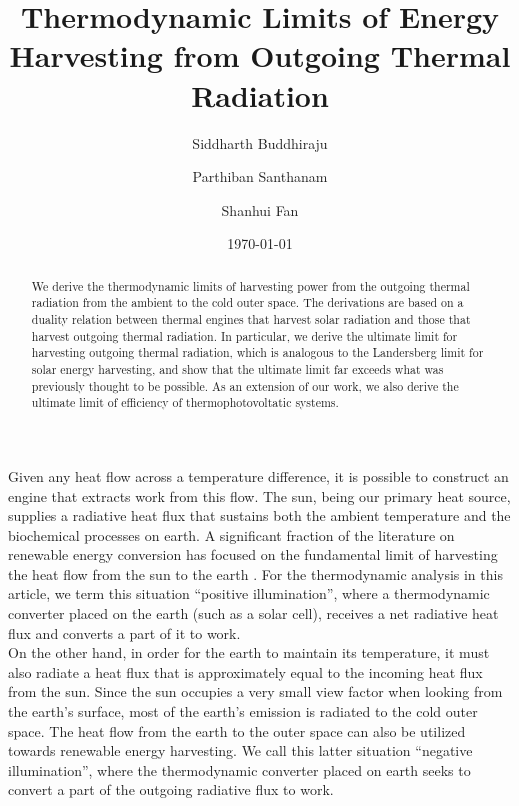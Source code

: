 \documentclass[notitlepage,onecolumn,aps,showpacs,preprintnumbers,amsmath,amssymb,superscriptaddress]{revtex4-1}
\begin{document}
\title{Thermodynamic Limits of Energy Harvesting from Outgoing Thermal Radiation}
\bigskip
\author{Siddharth Buddhiraju}
\author{Parthiban Santhanam}
\author{Shanhui Fan}
\date{\today}
\medskip
\widetext

\begin{abstract}
We derive the thermodynamic limits of harvesting power from the outgoing thermal radiation from the ambient to the cold outer space. The derivations are based on a duality relation between thermal engines that harvest solar radiation and those that harvest outgoing thermal radiation. In particular, we derive the ultimate limit for harvesting outgoing thermal radiation, which is analogous to the Landersberg limit for solar energy harvesting, and show that the ultimate limit far exceeds what was previously thought to be possible.  As an extension of our work, we also derive the ultimate limit of efficiency of thermophotovoltatic systems. 
\end{abstract}
\maketitle
Given any heat flow across a temperature difference, it is possible to construct an engine that extracts work from this flow. The sun, being our primary heat source, supplies a radiative heat flux that sustains both the ambient temperature and the biochemical processes on earth. A significant fraction of the literature on renewable energy conversion has focused on the fundamental limit of harvesting the heat flow from the sun to the earth \citep{shockleyqueisser, henry, yablonovitch, yablonovitch1, yablonovitch3, green, greenauger, greenbook, yupnas, yuprl}. For the thermodynamic analysis in this article, we term this situation ``positive illumination'', where a thermodynamic converter placed on the earth (such as a solar cell), receives a net radiative heat flux and converts a part of it to work.\\

On the other hand, in order for the earth to maintain its temperature, it must also radiate a heat flux that is approximately equal to the incoming heat flux from the sun. Since the sun occupies a very small view factor when looking from the earth's surface, most of the earth's emission is radiated to the cold outer space. The heat flow from the earth to the outer space can also be utilized towards renewable energy harvesting. We call this latter situation ``negative illumination'', where the thermodynamic converter placed on earth seeks to convert a part of the outgoing radiative flux to work. \\
\end{document}

